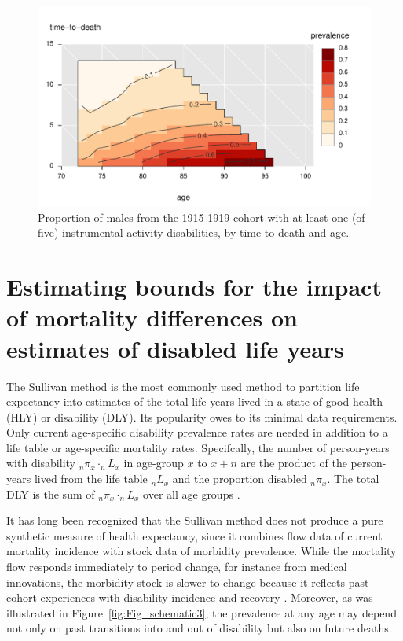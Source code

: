 \documentclass[11pt,oneside,a4paper]{article} %
\begin{document}
\begin{figure}
\begin{adjustwidth}{-1.5cm}{}
	\centering
	\includegraphics[scale=.8]{Figures/IADL1_Males.pdf}
	\caption{Proportion of males from the 1915-1919 cohort with at least one (of
	five) instrumental activity disabilities, by time-to-death and age.}
	\label{fig:IADL_ATL}
\end{adjustwidth}
\end{figure}


\FloatBarrier
\section{Estimating bounds for the impact of mortality differences on estimates of disabled life years}

The Sullivan method is the most commonly used method to partition life
expectancy into estimates of the total life years lived in a state of good
health (HLY) or disability (DLY). Its popularity owes to its minimal data
requirements. Only current age-specific disability prevalence rates are needed
in addition to a life table or age-specific mortality rates. Specifcally, the
number of person-years with disability $_{n}\pi _{x} \cdot _{n}L _{x}$ in
age-group $x$ to $x+n$ are the product of the person-years lived from the life
table $_{n}L _{x}$ and the proportion disabled $_{n}\pi _{x}$. The total DLY is
the sum of  $_{n}\pi _{x} \cdot _{n}L _{x}$ over all age groups
\citep{Sullivan1970}.

It has long been recognized that the Sullivan method does not produce a pure
synthetic measure of health expectancy, since it combines flow data of current
mortality incidence with stock data of morbidity prevalence. While the mortality
flow responds immediately to period change, for instance from medical
innovations, the morbidity stock is slower to change because it reflects past
cohort experiences with disability incidence and recovery
\citep{Mathers1997,Barendregt1994}. Moreover, as was illustrated in
Figure~\ref{fig:Fig_schematic3}, the prevalence at any age may depend not only
on past transitions into and out of disability but also on future deaths.
\end{document}
